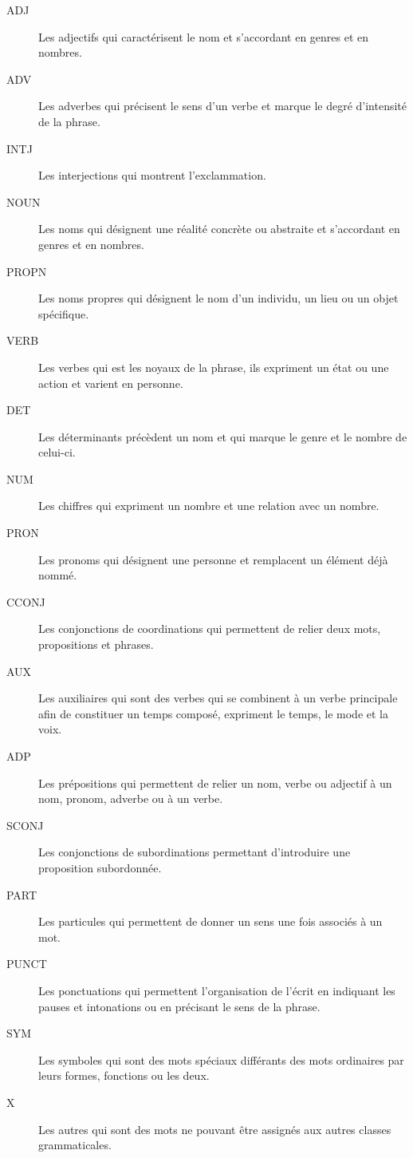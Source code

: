 \begin{description} 
\item[ADJ] Les adjectifs qui caractérisent le nom et s'accordant en genres et en nombres. 
\item[ADV] Les adverbes qui précisent le sens d'un verbe et marque le degré d'intensité de la phrase. 
\item[INTJ] Les interjections qui montrent l'exclammation. 
\item[NOUN] Les noms qui désignent une réalité concrète ou abstraite et s'accordant en genres et en nombres. 
\item[PROPN] Les noms propres qui désignent le nom d'un individu, un lieu ou un objet spécifique. 
\item[VERB] Les verbes qui est les noyaux de la phrase, ils expriment un état ou une action et varient en personne. 
\item[DET] Les déterminants précèdent un nom et qui marque le genre et le nombre de celui-ci. 
\item[NUM] Les chiffres qui expriment un nombre et une relation avec un nombre. 
\item[PRON] Les pronoms qui désignent une personne et remplacent un élément déjà nommé. 
\item[CCONJ] Les conjonctions de coordinations qui permettent de relier deux mots, propositions et phrases. 
\item[AUX] Les auxiliaires qui sont des verbes qui se combinent à un verbe principale afin de constituer un temps composé, expriment le temps, le mode et la voix. 
\item[ADP] Les prépositions qui permettent de relier un nom, verbe ou adjectif à un nom, pronom, adverbe ou à un verbe. 
\item[SCONJ] Les conjonctions de subordinations permettant d'introduire une proposition subordonnée. 
\item[PART] Les particules qui permettent de donner un sens une fois associés à un mot. 
\item[PUNCT] Les ponctuations qui permettent l'organisation de l'écrit en indiquant les pauses et intonations ou en précisant le sens de la phrase. 
\item[SYM] Les symboles qui sont des mots spéciaux différants des mots ordinaires par leurs formes, fonctions ou les deux. 
\item[X] Les autres qui sont des mots ne pouvant être assignés aux autres classes grammaticales. 
\end{description}


